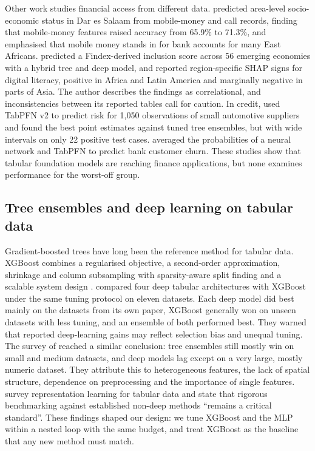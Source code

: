 \documentclass[11pt]{article}
\begin{document}
Other work studies financial access from different data. \citet{engelmann2018unbanked} predicted area-level socio-economic status in Dar es Salaam from mobile-money and call records, finding that mobile-money features raised accuracy from 65.9\% to 71.3\%, and emphasised that mobile money stands in for bank accounts for many East Africans. \citet{chen2026evaluating} predicted a Findex-derived inclusion score across 56 emerging economies with a hybrid tree and deep model, and reported region-specific SHAP signs for digital literacy, positive in Africa and Latin America and marginally negative in parts of Asia. The author describes the findings as correlational, and inconsistencies between its reported tables call for caution. In credit, \citet{shan2026tabpfn} used TabPFN v2 to predict risk for 1,050 observations of small automotive suppliers and found the best point estimates against tuned tree ensembles, but with wide intervals on only 22 positive test cases. \citet{pathan2026intelligent} averaged the probabilities of a neural network and TabPFN to predict bank customer churn. These studies show that tabular foundation models are reaching finance applications, but none examines performance for the worst-off group.

\subsection{Tree ensembles and deep learning on tabular data}

Gradient-boosted trees have long been the reference method for tabular data. XGBoost combines a regularised objective, a second-order approximation, shrinkage and column subsampling with sparsity-aware split finding and a scalable system design \citep{chen2016xgboost}. \citet{shwartzziv2021tabular} compared four deep tabular architectures with XGBoost under the same tuning protocol on eleven datasets. Each deep model did best mainly on the datasets from its own paper, XGBoost generally won on unseen datasets with less tuning, and an ensemble of both performed best. They warned that reported deep-learning gains may reflect selection bias and unequal tuning. The survey of \citet{borisov2024deep} reached a similar conclusion: tree ensembles still mostly win on small and medium datasets, and deep models lag except on a very large, mostly numeric dataset. They attribute this to heterogeneous features, the lack of spatial structure, dependence on preprocessing and the importance of single features. \citet{jiang2026representation} survey representation learning for tabular data and state that rigorous benchmarking against established non-deep methods ``remains a critical standard''. These findings shaped our design: we tune XGBoost and the MLP within a nested loop with the same budget, and treat XGBoost as the baseline that any new method must match.
\end{document}
